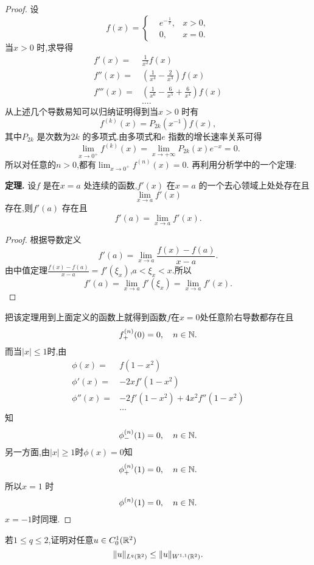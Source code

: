 \begin{proof}
  设
  \begin{equation*}
    f(x)=\left\{
      \begin{aligned}
	& e^{-\frac{1}{x}}, & x>0,\\
	& 0, & x=0.
      \end{aligned}\right.
  \end{equation*}
当$x>0$ 时,求导得
\begin{align*}
  f'(x)= & \frac{1}{x^2}f(x)\\
  f''(x)= & \left(\frac{1}{x^4}-\frac{2}{x^3}\right)f(x)\\
  f'''(x) = & \left( \frac{1}{x^{6}}-\frac{6}{x^{5}}+\frac{6}{x^{4}} \right) f(x)\\
  & \ldots
.\end{align*}
从上述几个导数易知可以归纳证明得到当$x>0$ 时有
\[
  f^{(k)}(x)=P_{2k}(x^{-1})f(x),
\] 
其中$P_{2k}$ 是次数为$2k$ 的多项式.由多项式和$e$ 指数的增长速率关系可得
\[
  \lim_{x\to 0^{+}}f^{(k)}(x)=\lim_{x\to+\infty}P_{2k}(x)e^{-x}=0.
\] 
所以对任意的$n>0$,都有$\lim_{x\to 0^{+}}f^{(n)}(x)=0$.
再利用分析学中的一个定理:
\begin{framed}
  \noindent \textbf{定理. } 设$f$ 是在$x=a$ 处连续的函数,$f'(x)$ 在$x=a$ 的一个去心领域上处处存在且
  \[
    \lim_{x\to a}f'(x)
  \] 
  存在,则$f'(a)$ 存在且
  \[
    f'(a)=\lim_{x\to a}f'(x).
  \] 
  \begin{proof}
    根据导数定义 
    \[
      f'(a)=\lim_{x\to a}\frac{f(x)-f(a)}{x-a}.
    \] 
    由中值定理$\frac{f(x)-f(a)}{x-a}=f'(\xi_x)$,$a<\xi_x<x$.所以
    \[
      f'(a)=\lim_{x\to a}f'(\xi_x)=\lim_{x\to a}f'(x).
    \] 
  \end{proof}
\end{framed}
把该定理用到上面定义的函数上就得到函数$f$在$x=0$处任意阶右导数都存在且
\[
  f^{(n)}_{+}(0)=0,\quad n\in \mathbb{N}.
\] 
而当$|x|\le 1$时,由
\begin{align*}
  \phi(x)=&f(1-x^2)\\
  \phi'(x)=&-2xf'(1-x^2)\\
  \phi''(x)=& -2f'(1-x^2)+4x^2f''(1-x^2)\\
	    &\ldots
\end{align*}
知
\[
  \phi^{(n)}_{-}(1)=0, \quad n\in \mathbb{N}.
\] 
另一方面,由$|x|\ge 1$时$\phi(x)=0$知
\[
  \phi^{(n)}_{+}(1)=0, \quad n\in \mathbb{N}.
\] 
所以$x=1$ 时
\[
  \phi^{(n)}(1)=0,\quad n\in \mathbb{N}.
\] 
$x=-1$时同理.

\end{proof}
\begin{exercise}
  若$1\le q\le 2$,证明对任意$u\in C^{1}_0(\mathbb{R}^2)$ 
  \[
    \|u\|_{L^{q}(\mathbb{R}^2)}\le \|u\|_{W^{1,1}(\mathbb{R}^2)}.
  \] 
\end{exercise}
